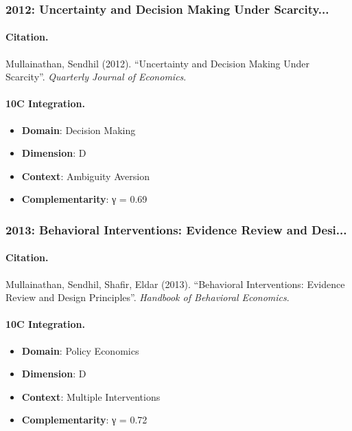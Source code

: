 \subsubsection{2012: Uncertainty and Decision Making Under Scarcity...}

\paragraph{Citation.}
Mullainathan, Sendhil (2012). ``Uncertainty and Decision Making Under Scarcity''. \textit{Quarterly Journal of Economics}.

\paragraph{10C Integration.}
\begin{itemize}[nosep]
  \item \textbf{Domain}: Decision Making
  \item \textbf{Dimension}: D
  \item \textbf{Context}: Ambiguity Aversion
  \item \textbf{Complementarity}: γ = 0.69
\end{itemize}


\subsubsection{2013: Behavioral Interventions: Evidence Review and Desi...}

\paragraph{Citation.}
Mullainathan, Sendhil, Shafir, Eldar (2013). ``Behavioral Interventions: Evidence Review and Design Principles''. \textit{Handbook of Behavioral Economics}.

\paragraph{10C Integration.}
\begin{itemize}[nosep]
  \item \textbf{Domain}: Policy Economics
  \item \textbf{Dimension}: D
  \item \textbf{Context}: Multiple Interventions
  \item \textbf{Complementarity}: γ = 0.72
\end{itemize}



